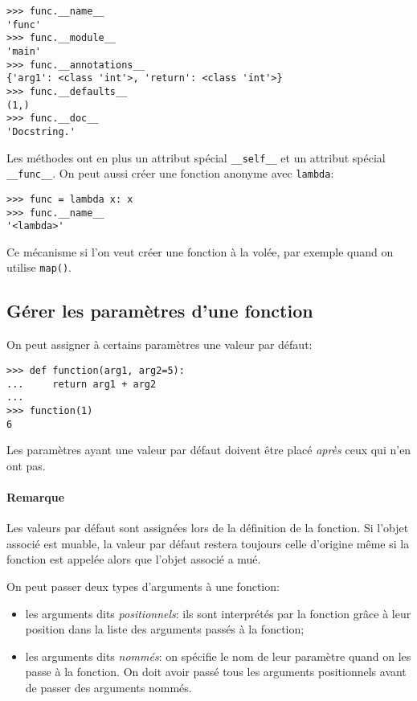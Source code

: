 \begin{verbatim}
>>> func.__name__
'func'
>>> func.__module__
'main'
>>> func.__annotations__
{'arg1': <class 'int'>, 'return': <class 'int'>}
>>> func.__defaults__
(1,)
>>> func.__doc__
'Docstring.'
\end{verbatim}

Les méthodes ont en plus un attribut spécial \texttt{__self__} et un attribut spécial \texttt{__func__}. On peut aussi créer une fonction anonyme avec \texttt{lambda}:

\begin{verbatim}
>>> func = lambda x: x
>>> func.__name__
'<lambda>'
\end{verbatim}

Ce mécanisme si l'on veut créer une fonction à la volée, par exemple quand on utilise \texttt{map()}.

\subsection{Gérer les paramètres d'une fonction}

On peut assigner à certains paramètres une valeur par défaut:

\begin{verbatim}
>>> def function(arg1, arg2=5):
...     return arg1 + arg2
... 
>>> function(1)
6
\end{verbatim}

Les paramètres ayant une valeur par défaut doivent être placé \emph{après} ceux qui n'en ont pas.

\paragraph*{Remarque} Les valeurs par défaut sont assignées lors de la définition de la fonction. Si l'objet associé est
muable, la valeur par défaut restera toujours celle d'origine même si la fonction est appelée alors que l'objet associé
a mué.\medskip

On peut passer deux types d'arguments à une fonction:
\begin{itemize}
    \item les arguments dits \emph{positionnels}: ils sont interprétés par la fonction grâce à leur position dans
          la liste des arguments passés à la fonction;
    \item les arguments dits \emph{nommés}: on spécifie le nom de leur paramètre quand on les passe à la fonction.
          On doit avoir passé tous les arguments positionnels avant de passer des arguments nommés.
\end{itemize}

